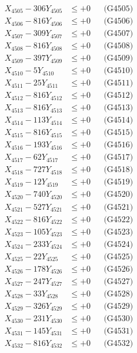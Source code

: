 \documentclass[a4paper,10pt]{article}
\begin{document}
{\begin{align}
X_{4505} - 306Y_{4505} &\leq +0 && \text{(G4505)} \\
X_{4506} - 816Y_{4506} &\leq +0 && \text{(G4506)} \\
X_{4507} - 309Y_{4507} &\leq +0 && \text{(G4507)} \\
X_{4508} - 816Y_{4508} &\leq +0 && \text{(G4508)} \\
X_{4509} - 397Y_{4509} &\leq +0 && \text{(G4509)} \\
X_{4510} - 5Y_{4510} &\leq +0 && \text{(G4510)} \\
\allowbreak
X_{4511} - 25Y_{4511} &\leq +0 && \text{(G4511)} \\
X_{4512} - 816Y_{4512} &\leq +0 && \text{(G4512)} \\
X_{4513} - 816Y_{4513} &\leq +0 && \text{(G4513)} \\
X_{4514} - 113Y_{4514} &\leq +0 && \text{(G4514)} \\
X_{4515} - 816Y_{4515} &\leq +0 && \text{(G4515)} \\
X_{4516} - 193Y_{4516} &\leq +0 && \text{(G4516)} \\
X_{4517} - 62Y_{4517} &\leq +0 && \text{(G4517)} \\
X_{4518} - 727Y_{4518} &\leq +0 && \text{(G4518)} \\
X_{4519} - 12Y_{4519} &\leq +0 && \text{(G4519)} \\
X_{4520} - 740Y_{4520} &\leq +0 && \text{(G4520)} \\
\allowbreak
X_{4521} - 527Y_{4521} &\leq +0 && \text{(G4521)} \\
X_{4522} - 816Y_{4522} &\leq +0 && \text{(G4522)} \\
X_{4523} - 105Y_{4523} &\leq +0 && \text{(G4523)} \\
X_{4524} - 233Y_{4524} &\leq +0 && \text{(G4524)} \\
X_{4525} - 22Y_{4525} &\leq +0 && \text{(G4525)} \\
X_{4526} - 178Y_{4526} &\leq +0 && \text{(G4526)} \\
X_{4527} - 247Y_{4527} &\leq +0 && \text{(G4527)} \\
X_{4528} - 33Y_{4528} &\leq +0 && \text{(G4528)} \\
X_{4529} - 326Y_{4529} &\leq +0 && \text{(G4529)} \\
X_{4530} - 231Y_{4530} &\leq +0 && \text{(G4530)} \\
\allowbreak
X_{4531} - 145Y_{4531} &\leq +0 && \text{(G4531)} \\
X_{4532} - 816Y_{4532} &\leq +0 && \text{(G4532)} \\

\end{align}}
\end{document}
